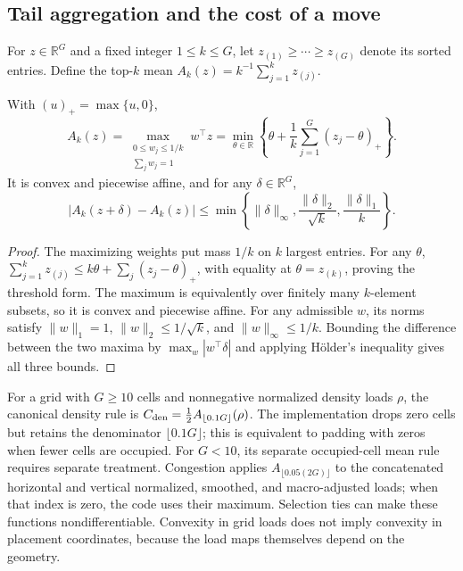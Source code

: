 \subsection{Tail aggregation and the cost of a move}\label{sec:tail-analysis}

For $z\in\mathbb R^G$ and a fixed integer $1\le k\le G$, let
$z_{(1)}\ge\cdots\ge z_{(G)}$ denote its sorted entries. Define the top-$k$ mean
$A_k(z)=k^{-1}\sum_{j=1}^k z_{(j)}$.

\begin{lemma}\label{lem:tail}
With $(u)_+=\max\{u,0\}$,
\begin{equation}
 A_k(z)
 =\max_{\substack{0\le w_j\le1/k\\\sum_j w_j=1}}w^\top z
 =\min_{\theta\in\mathbb R}\left\{\theta+
 \frac1k\sum_{j=1}^G(z_j-\theta)_+\right\}.
 \label{eq:tail-representation}
\end{equation}
It is convex and piecewise affine, and for any $\delta\in\mathbb R^G$,
\begin{equation}
 |A_k(z+\delta)-A_k(z)|
 \le\min\left\{\|\delta\|_\infty,
          \frac{\|\delta\|_2}{\sqrt{k}},
          \frac{\|\delta\|_1}{k}\right\}.
 \label{eq:tail-stability}
\end{equation}
\end{lemma}
\begin{proof}
The maximizing weights put mass $1/k$ on $k$ largest entries. For any $\theta$,
$\sum_{j=1}^k z_{(j)}\le k\theta+\sum_j(z_j-\theta)_+$, with equality at
$\theta=z_{(k)}$, proving the threshold form. The maximum is equivalently over
finitely many $k$-element subsets, so it is convex and piecewise affine. For any
admissible $w$, its norms satisfy $\|w\|_1=1$,
$\|w\|_2\le1/\sqrt{k}$, and $\|w\|_\infty\le1/k$.
Bounding the difference between the two maxima by
$\max_w|w^\top\delta|$ and applying H\"older's inequality gives all three bounds.
\end{proof}

For a grid with $G\ge10$ cells and nonnegative normalized density loads $\rho$,
the canonical density rule is
$C_{\rm den}=\tfrac12 A_{\lfloor0.1G\rfloor}(\rho)$. The implementation drops
zero cells but retains the denominator $\lfloor0.1G\rfloor$; this is equivalent
to padding with zeros when fewer cells are occupied. For $G<10$, its separate
occupied-cell mean rule requires separate treatment. Congestion applies
$A_{\lfloor0.05(2G)\rfloor}$ to the concatenated horizontal and vertical
normalized, smoothed, and macro-adjusted loads; when that index is zero, the
code uses their maximum. Selection ties can make these functions
nondifferentiable. Convexity in grid loads does not imply convexity in placement
coordinates, because the load maps themselves depend on the geometry.

